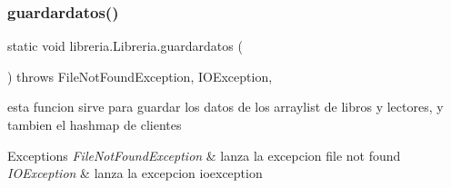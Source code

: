 \subsubsection{\texorpdfstring{guardardatos()}{guardardatos()}}
{\footnotesize\ttfamily static void libreria.\+Libreria.\+guardardatos (\begin{DoxyParamCaption}{ }\end{DoxyParamCaption}) throws File\+Not\+Found\+Exception, I\+O\+Exception\hspace{0.3cm}{\ttfamily [inline]}, {\ttfamily [static]}}

esta funcion sirve para guardar los datos de los arraylist de libros y lectores, y tambien el hashmap de clientes 
\begin{DoxyExceptions}{Exceptions}
{\em File\+Not\+Found\+Exception} & lanza la excepcion file not found \\
\hline
{\em I\+O\+Exception} & lanza la excepcion ioexception \\
\hline
\end{DoxyExceptions}

